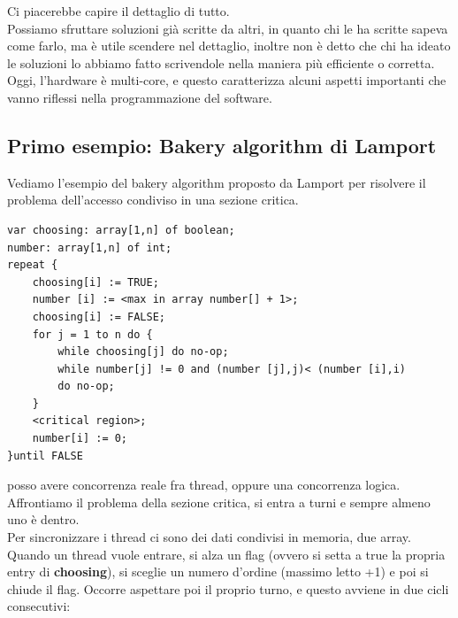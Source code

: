 \documentclass[12pt, oneside]{extbook}
\begin{document}
Ci piacerebbe capire il dettaglio di tutto.\\ Possiamo sfruttare soluzioni già scritte da altri, in quanto chi le ha scritte sapeva come farlo, ma è utile scendere nel dettaglio, inoltre non è detto che chi ha ideato le soluzioni lo abbiamo fatto scrivendole nella maniera più efficiente o corretta. Oggi, l'hardware è multi-core, e questo caratterizza alcuni aspetti importanti che vanno riflessi nella programmazione del software.
\subsection{Primo esempio: Bakery algorithm di Lamport}
Vediamo l'esempio del bakery algorithm proposto da Lamport per risolvere il problema dell'accesso condiviso in una sezione critica.
\begin{lstlisting}
var choosing: array[1,n] of boolean;
number: array[1,n] of int;
repeat {
	choosing[i] := TRUE;
	number [i] := <max in array number[] + 1>;
	choosing[i] := FALSE;
	for j = 1 to n do {
		while choosing[j] do no-op;
		while number[j] != 0 and (number [j],j)< (number [i],i)
		do no-op;
	}
	<critical region>;
	number[i] := 0;
}until FALSE
\end{lstlisting}
posso avere concorrenza reale fra thread, oppure una concorrenza logica. Affrontiamo il problema della sezione critica, si entra a turni e sempre almeno uno è dentro.\\ Per sincronizzare i thread ci sono dei dati condivisi in memoria, due array.\\ Quando un thread vuole entrare, si alza un flag (ovvero si setta a true la propria entry di \textbf{choosing}), si sceglie un numero d'ordine (massimo letto +1) e poi si chiude il flag. Occorre aspettare poi il proprio turno, e questo avviene in due cicli consecutivi:
\end{document}
